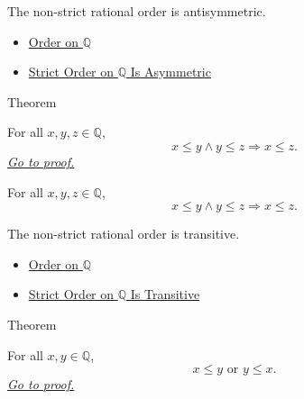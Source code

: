 \begin{remark*}[Interpretation]
The non-strict rational order is antisymmetric.
\end{remark*}

\begin{dependencies}
\begin{itemize}
  \item \hyperref[def:order-on-q]{Order on $\mathbb{Q}$}
  \item \hyperref[thm:strict-order-on-q-asymmetric]{Strict Order on $\mathbb{Q}$ Is Asymmetric}
\end{itemize}
\end{dependencies}

\begin{theorembox}{Theorem}
\begin{theorem}
\label{thm:order-on-q-transitive}
For all $x,y,z\in\mathbb{Q}$,
\[
x\le y\land y\le z \Longrightarrow x\le z.
\]
\hyperref[prf:order-on-q-transitive]{\textit{Go to proof.}}
\end{theorem}
\end{theorembox}

\begin{remark*}
For all $x,y,z\in\mathbb{Q}$,
\[
x\le y\land y\le z\Longrightarrow x\le z.
\]
\end{remark*}

\begin{remark*}[Interpretation]
The non-strict rational order is transitive.
\end{remark*}

\begin{dependencies}
\begin{itemize}
  \item \hyperref[def:order-on-q]{Order on $\mathbb{Q}$}
  \item \hyperref[thm:strict-order-on-q-transitive]{Strict Order on $\mathbb{Q}$ Is Transitive}
\end{itemize}
\end{dependencies}

\begin{theorembox}{Theorem}
\begin{theorem}
\label{thm:order-on-q-total}
For all $x,y\in\mathbb{Q}$,
\[
x\le y\text{ or }y\le x.
\]
\hyperref[prf:order-on-q-total]{\textit{Go to proof.}}
\end{theorem}
\end{theorembox}

